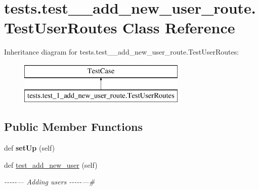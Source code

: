 \hypertarget{classtests_1_1test__1__add__new__user__route_1_1_test_user_routes}{}\section{tests.\+test\+\_\+\_\+add\+\_\+new\+\_\+user\+\_\+route.\+Test\+User\+Routes Class Reference}
\label{classtests_1_1test__1__add__new__user__route_1_1_test_user_routes}
Inheritance diagram for tests.\+test\+\_\+\_\+add\+\_\+new\+\_\+user\+\_\+route.\+Test\+User\+Routes\+:\begin{figure}[H]
\begin{center}
\leavevmode
\includegraphics[height=2.000000cm]{classtests_1_1test__1__add__new__user__route_1_1_test_user_routes}
\end{center}
\end{figure}
\subsection*{Public Member Functions}
\begin{DoxyCompactItemize}
\item 
\mbox{\label{classtests_1_1test__1__add__new__user__route_1_1_test_user_routes_aea4e4849bb5076ccc22c20be643e6a0b}} 
def {\bfseries set\+Up} (self)
\item 
\mbox{\label{classtests_1_1test__1__add__new__user__route_1_1_test_user_routes_a7f6feef69e3a930caf8313357219fae1}} 
def \hyperlink{classtests_1_1test__1__add__new__user__route_1_1_test_user_routes_a7f6feef69e3a930caf8313357219fae1}{test\+\_\+add\+\_\+new\+\_\+user} (self)
\begin{DoxyCompactList}\small\item\em -\/-\/-\/-\/-\/--- Adding users -\/-\/-\/-\/-\/---\# \end{DoxyCompactList}\end{DoxyCompactItemize}
